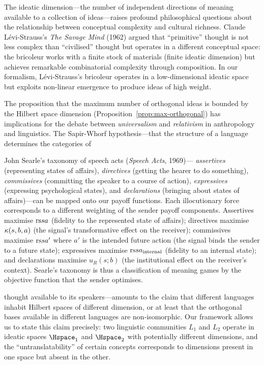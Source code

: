 \begin{interpretation}
\label{interp:ch12:dimension_philosophy}
The ideatic dimension---the number of independent directions of meaning
available to a collection of ideas---raises profound philosophical questions
about the relationship between conceptual complexity and cultural richness.
Claude L\'evi-Strauss's \emph{The Savage Mind} (1962) argued that
``primitive'' thought is not less complex than ``civilised'' thought but
operates in a different conceptual space: the bricoleur works with a finite
stock of materials (finite ideatic dimension) but achieves remarkable
combinatorial complexity through composition.  In our formalism,
L\'evi-Strauss's bricoleur operates in a low-dimensional ideatic space but
exploits non-linear emergence to produce ideas of high weight.

The proposition that the maximum number of orthogonal ideas is bounded by
the Hilbert space dimension (Proposition~\ref{prop:max-orthogonal}) has
implications for the debate between \emph{universalism} and
\emph{relativism} in anthropology and linguistics.  The Sapir-Whorf
hypothesis---that the structure of a language determines the categories of

\begin{remark}
\label{rem:ch13:searle_speech_acts}
John Searle's taxonomy of speech acts (\emph{Speech Acts}, 1969)---
\emph{assertives} (representing states of affairs), \emph{directives}
(getting the hearer to do something), \emph{commissives} (committing the
speaker to a course of action), \emph{expressives} (expressing psychological
states), and \emph{declarations} (bringing about states of affairs)---can be
mapped onto our payoff functions.  Each illocutionary force corresponds to a
different weighting of the sender payoff components.  Assertives maximise
$\mathrm{rs}{s}{a}$ (fidelity to the represented state of affairs); directives
maximise $\kappa(s, b, a)$ (the signal's transformative effect on the
receiver); commissives maximise $\mathrm{rs}{s}{a'}$ where $a'$ is the intended
future action (the signal binds the sender to a future state); expressives
maximise $\mathrm{rs}{s}{a_{\mathrm{internal}}}$ (fidelity to an internal state);
and declarations maximise $u_R(s; b)$ (the institutional effect on the
receiver's context).  Searle's taxonomy is thus a classification of meaning
games by the objective function that the sender optimises.
\end{remark}


thought available to its speakers---amounts to the claim that different
languages inhabit Hilbert spaces of different dimension, or at least that
the orthogonal bases available in different languages are non-isomorphic.
Our framework allows us to state this claim precisely: two linguistic
communities $L_1$ and $L_2$ operate in ideatic spaces
$\Hspace_1$ and $\Hspace_2$ with potentially different dimensions, and
the ``untranslatability'' of certain concepts corresponds to dimensions
present in one space but absent in the other.
\end{interpretation}



